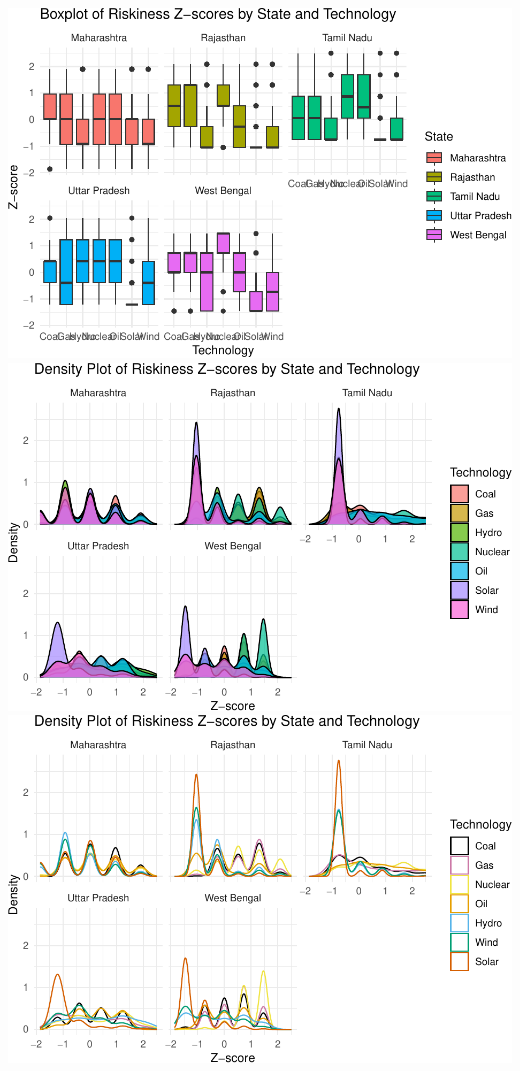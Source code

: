 \documentclass[
]{article}
\begin{document}
\includegraphics{nuclear-in-comparison_files/figure-latex/unnamed-chunk-35-1.pdf}
\includegraphics{nuclear-in-comparison_files/figure-latex/unnamed-chunk-35-2.pdf}
\includegraphics{nuclear-in-comparison_files/figure-latex/unnamed-chunk-35-3.pdf}
\end{document}
